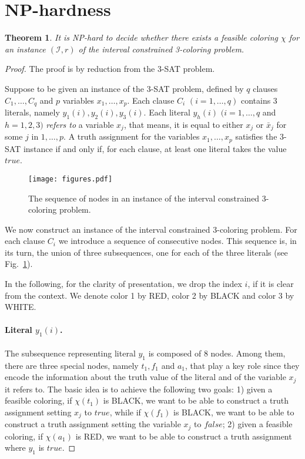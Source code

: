 \documentclass[a4paper,11pt]{article}
\providecommand{\I}{\mathcal{I}}
\theoremstyle{theorem}
\newtheorem{theorem}{Theorem}
\begin{document}
\section{NP-hardness}

\begin{theorem}
It is NP-hard to decide whether there exists a feasible coloring $\chi$ for an instance $(\I, r)$ of the interval constrained 3-coloring problem.
\end{theorem}

\begin{proof}
The proof is by reduction from the 3-SAT problem.

\smallskip
\noindent Suppose to be given an instance of the 3-SAT problem, defined by $q$ clauses $C_1, \dots, C_q$ and $p$ variables $x_1, \dots, x_p$. Each clause $C_i$ $(i=1, \dots, q)$ contains 3 literals, namely $y_1(i),y_2(i),y_3(i)$. Each literal
$y_h(i)$ $(i=1, \dots, q$ and $h=1,2,3)$ \emph{refers to} a variable $x_j$, that means, it is equal to either $x_j$ or $\bar x_j$ for some $j$ in $1, \dots, p$. A truth assignment for the variables $x_1, \dots, x_p$ satisfies the 3-SAT instance 
if and only if, for each clause, at least one literal takes the value $true$.

\begin{figure}[htb]
\centering
\texttt{[image: figures.pdf]} 
\caption{The sequence of nodes in an instance of the interval constrained 3-coloring problem.}
\label{fig:1}
\end{figure}

We now construct an instance of the interval constrained 3-coloring problem.
For each clause $C_i$ we introduce a sequence of consecutive nodes.
This sequence is, in its turn,  the union of three subsequences, one for each of the three literals (see Fig.~\ref{fig:1}).

In the following, for the clarity of presentation, we drop the index $i$, if it is clear from the context. We denote color 1 by RED, color 2 by BLACK and color 3 by WHITE. 



\paragraph{Literal $y_1(i)$.}  The subsequence representing literal $y_1$ is composed of 8 nodes. Among them, there are three special nodes, namely $t_1,f_1$ and $a_1$, that play a key role since they encode the information about the truth value of the literal and of the variable $x_j$ it refers to. The basic idea is to achieve the following two goals: 1) given a feasible coloring, if $\chi(t_1)$ is BLACK, we want to be able to construct a truth assignment setting $x_j$ to $true$, while if $\chi(f_1)$ is BLACK, we want to be able to construct a truth assignment setting the variable $x_j$ to $false$; 2) given a feasible coloring, if $\chi(a_1)$ is RED, we want to be able to construct a truth assignment where $y_1$ is $true$.


\end{proof}
\end{document}
